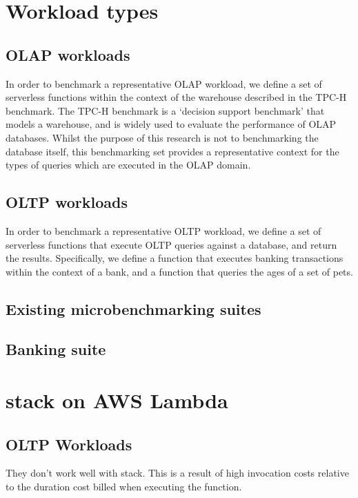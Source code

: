 \section{Workload types}
\subsection{OLAP workloads}
In order to benchmark a representative OLAP workload, we define a set of serverless functions within the context of the warehouse described in the TPC-H benchmark. The TPC-H benchmark is a `decision support benchmark' that models a warehouse, and is widely used to evaluate the performance of OLAP databases. Whilst the purpose of this research is not to benchmarking the database itself, this benchmarking set provides a representative context for the types of queries which are executed in the OLAP domain.

\subsection{OLTP workloads}
In order to benchmark a representative OLTP workload, we define a set of serverless functions that execute OLTP queries against a database, and return the results. Specifically, we define a function that executes banking transactions within the context of a bank, and a function that queries the ages of a set of pets.

\subsection{Existing microbenchmarking suites}

\subsection{Banking suite}

\section{\faaas{} stack on AWS Lambda}

\subsection{OLTP Workloads}
They don't work well with \faaas{} stack. This is a result of high invocation costs relative to the duration cost billed when executing the function.

